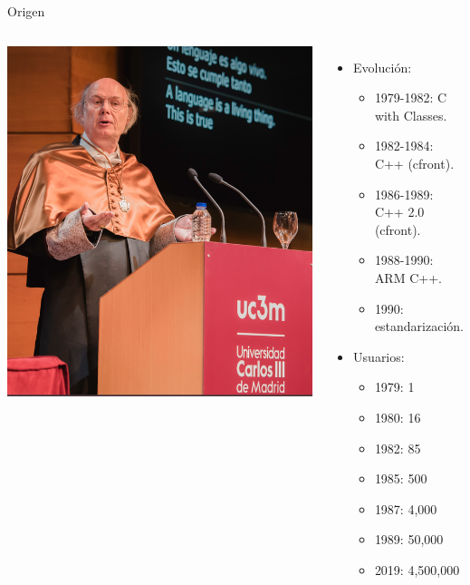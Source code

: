 \begin{frame}[t]{Origen}
\begin{columns}[T]
\includegraphics[width=\textwidth]{img/bjarne.png}

\begin{itemize}
  \item Evolución:
    \begin{itemize}
  \item 1979-1982: C with Classes.
  \item 1982-1984: C++ (cfront).
  \item 1986-1989: C++ 2.0 (cfront).
  \item 1988-1990: ARM C++.
  \item 1990: estandarización.
    \end{itemize}
  \vfill
  \item Usuarios:
    \begin{itemize}
      \item 1979: 1
      \item 1980: 16
      \item 1982: 85
      \item 1985: 500
      \item 1987: 4,000
      \item 1989: 50,000
      \item 2019: 4,500,000
    \end{itemize}
\end{itemize}
\end{columns}
\end{frame}

